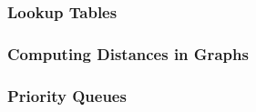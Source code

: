 \subsubsection{Lookup Tables}


\subsubsection{Computing Distances in Graphs}

\subsubsection{Priority Queues}





































\endinput

BEGIN OLD STUFF...



